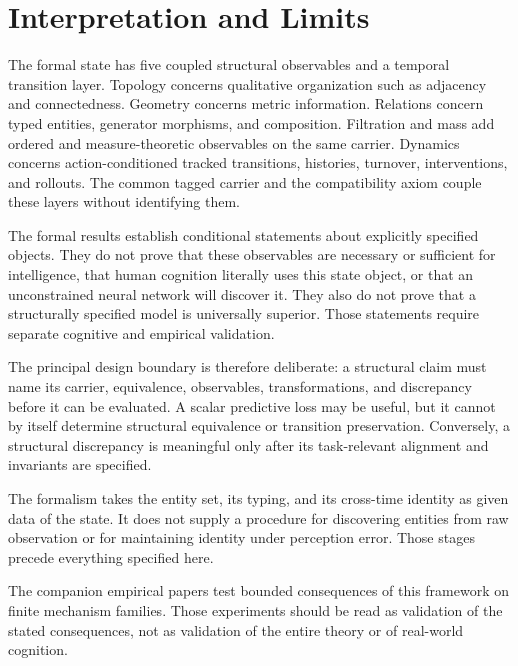 \section{Interpretation and Limits}

The formal state has five coupled structural observables and a temporal
transition layer. Topology concerns qualitative organization such as adjacency
and connectedness. Geometry concerns metric information. Relations concern
typed entities, generator morphisms, and composition. Filtration and mass add
ordered and measure-theoretic observables on the same carrier. Dynamics concerns
action-conditioned tracked transitions, histories, turnover, interventions, and
rollouts. The common tagged carrier and the compatibility axiom couple these
layers without identifying them.

The formal results establish conditional statements about explicitly specified
objects. They do not prove that these observables are necessary or sufficient
for intelligence, that human cognition literally uses this state object, or
that an unconstrained neural network will discover it. They also do not prove
that a structurally specified model is universally superior. Those statements
require separate cognitive and empirical validation.

The principal design boundary is therefore deliberate: a structural claim must
name its carrier, equivalence, observables, transformations, and discrepancy
before it can be evaluated. A scalar predictive loss may be useful, but it
cannot by itself determine structural equivalence or transition preservation.
Conversely, a structural discrepancy is meaningful only after its task-relevant
alignment and invariants are specified.

The formalism takes the entity set, its typing, and its cross-time identity as
given data of the state. It does not supply a procedure for discovering
entities from raw observation or for maintaining identity under perception
error. Those stages precede everything specified here.

The companion empirical papers test bounded consequences of this framework on
finite mechanism families. Those experiments should be read as validation of
the stated consequences, not as validation of the entire theory or of
real-world cognition.
